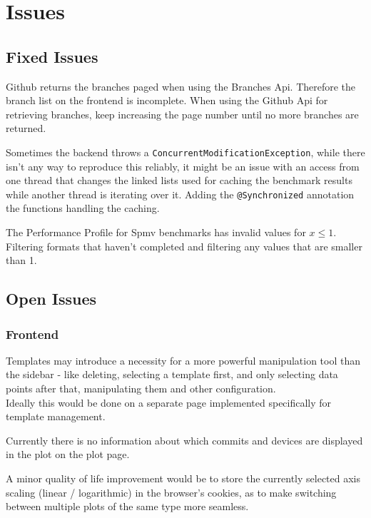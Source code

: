 \section{Issues}

\subsection{Fixed Issues}
{Github returns the branches paged when using the Branches Api. Therefore the branch list on the frontend is incomplete.}
{When using the Github Api for retrieving branches, keep increasing the page number until no more branches are returned.}

{Sometimes the backend throws a \texttt{ConcurrentModificationException}, while there isn't any way to reproduce this reliably, it might be an issue with an access from one thread that changes the linked lists used for caching the benchmark results while another thread is iterating over it.}
{Adding the \texttt{@Synchronized} annotation the functions handling the caching.}

{The Performance Profile for Spmv benchmarks has invalid values for $x \leq 1$.}
{Filtering formats that haven't completed and filtering any values that are smaller than 1.}

\subsection{Open Issues}

\subsubsection{Frontend}

{Templates may introduce a necessity for a more powerful manipulation tool than the sidebar - like deleting, selecting a template first, and only selecting data points after that, manipulating them and other configuration. \\
Ideally this would be done on a separate page implemented specifically for template management.}

{Currently there is no information about which commits and devices are displayed in the plot on the plot page.}

{A minor quality of life improvement would be to store the currently selected axis scaling (linear / logarithmic) in the browser's cookies, as to make switching between multiple plots of the same type more seamless.}

